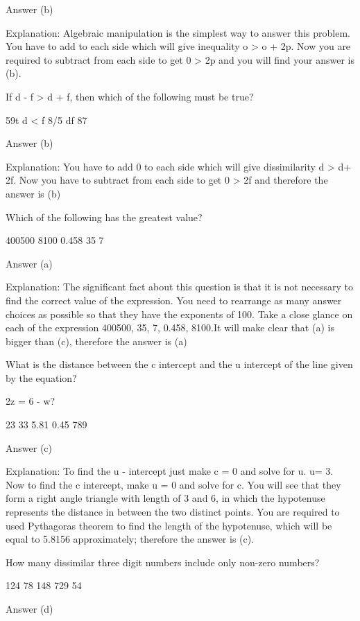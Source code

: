     Answer (b)

    Explanation: Algebraic manipulation is the simplest way to answer this problem. You have to add to each side which will give inequality o > o + 2p. Now you are required to subtract from each side to get 0 > 2p and you will find your answer is (b).

    If d - f > d + f, then which of the following must be true?

        59t
        d < f
        8/5
        df
        87 

    Answer (b)

    Explanation: You have to add 0 to each side which will give dissimilarity d > d+ 2f. Now you have to subtract from each side to get 0 > 2f and therefore the answer is (b)

    Which of the following has the greatest value?

        400500
        8100
        0.458
        35
        7 

    Answer (a)

    Explanation: The significant fact about this question is that it is not necessary to find the correct value of the expression. You need to rearrange as many answer choices as possible so that they have the exponents of 100. Take a close glance on each of the expression 400500, 35, 7, 0.458, 8100.It will make clear that (a) is bigger than (c), therefore the answer is (a)

    What is the distance between the c intercept and the u intercept of the line given by the equation?

    2z = 6 - w?

        23
        33
        5.81
        0.45
        789 

    Answer (c)

    Explanation: To find the u - intercept just make c = 0 and solve for u. u= 3. Now to find the c intercept, make u = 0 and solve for c. You will see that they form a right angle triangle with length of 3 and 6, in which the hypotenuse represents the distance in between the two distinct points. You are required to used Pythagoras theorem to find the length of the hypotenuse, which will be equal to 5.8156 approximately; therefore the answer is (c).

    How many dissimilar three digit numbers include only non-zero numbers?

        124
        78
        148
        729
        54 

    Answer (d)

